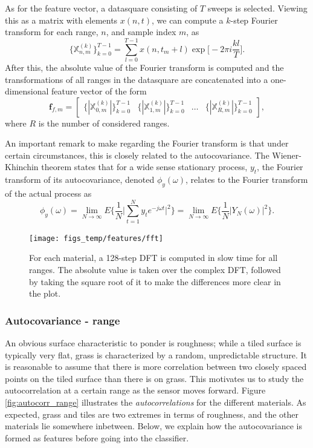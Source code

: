 As for the feature vector, a datasquare consisting of $T$ sweeps is selected. Viewing this as a matrix with elements $x(n,t)$, we can compute a $k$-step Fourier transform for each range, $n$, and sample index $m$, as
\begin{equation}
	\{\mathbb{X}^{(k)}_{n,m}\}_{k=0}^{T-1} =  \sum_{l=0}^{T-1}x(n,t_m+l)\exp\Big[-2\pi i\frac{kl}{T}\Big].
\end{equation}
After this, the absolute value of the Fourier transform is computed and the transformations of all ranges in the datasquare are concatenated into a one-dimensional feature vector of the form
\begin{equation}
	\textbf{f}_{f,m}=\begin{bmatrix} \{|\mathbb{X}_{0,m}^{(k)}|\}_{k=0}^{T-1} & \{|\mathbb{X}_{1,m}^{(k)}|\}_{k=0}^{T-1} & \hdots & \{|\mathbb{X}_{R,m}^{(k)}|\}_{k=0}^{T-1} \end{bmatrix},
\end{equation}
where $R$ is the number of considered ranges.

An important remark to make regarding the Fourier transform is that under certain circumstances, this is closely related to the autocovariance. The Wiener-Khinchin theorem states that for a wide sense stationary process, $y_t$, the Fourier transform of its autocovariance, denoted $\phi_y(\omega)$, relates to the Fourier transform of the actual process as
\begin{equation}
	\phi_y(\omega) = \lim\limits_{N\rightarrow\infty}E\Bigg\{\frac1N\Big|\sum^N_{t=1}y_te^{-j\omega t}\Big|^2\Bigg\}=\lim\limits_{N\rightarrow\infty}E\Big\{\frac1N|Y_N(\omega)|^2\Big\}.
\end{equation}


\begin{figure}[h]
	\centering
	\texttt{[image: figs\_temp/features/fft]}
	\caption{For each material, a 128-step DFT is computed in slow time for all ranges. The absolute value is taken over the complex DFT, followed by taking the square root of it to make the differences more clear in the plot. }
	\label{fig:fft}
\end{figure}


\subsubsection{Autocovariance - range}
An obvious surface characteristic to ponder is roughness; while a tiled surface is typically very flat, grass is characterized by a random, unpredictable structure. It is reasonable to assume that there is more correlation between two closely spaced points on the tiled surface than there is on grass. This motivates us to study the autocorrelation at a certain range as the sensor moves forward. Figure \ref{fig:autocorr_range} illustrates the \textit{autocorrelations} for the different materials. As expected, grass and tiles are two extremes in terms of roughness, and the other materials lie somewhere inbetween. Below, we explain how the autocovariance is formed as features before going into the classifier.


